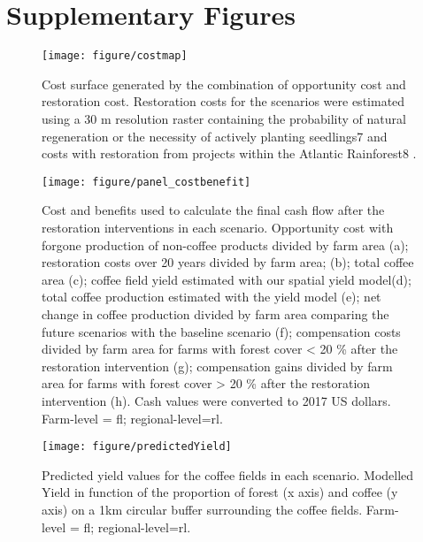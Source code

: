 \documentclass[
	12pt,				%
	oneside,			%
	a4paper,			%
	chapter=TITLE,		%
	section=TITLE,		%
	brazil,			%
	english				%
	]{abntex2}
\begin{document}
\hypertarget{supplementary-figures-1}{%
\section{Supplementary Figures}\label{supplementary-figures-1}}
\begin{figure}[H]

{\centering \texttt{[image: figure/costmap]} 

}

\caption{Cost surface generated by the combination of opportunity cost and restoration cost. Restoration costs for the scenarios were estimated using a 30 m resolution raster containing the probability of natural regeneration or the necessity of actively planting seedlings7 and costs with restoration from projects within the Atlantic Rainforest8 .}\label{fig:figureb1}
\end{figure}
\begin{figure}[H]

{\centering \texttt{[image: figure/panel\_costbenefit]} 

}

\caption{Cost and benefits used to calculate the final cash flow after the restoration interventions in each scenario. Opportunity cost with forgone production of non-coffee products divided by farm area (a);  restoration costs over 20 years divided by farm area; (b); total coffee area (c); coffee field yield estimated with our spatial yield model(d); total coffee production estimated with the yield model (e); net change in coffee production divided by farm area comparing the future scenarios with the baseline scenario (f); compensation costs divided by farm area for farms with forest cover < 20 \% after the restoration intervention (g); compensation gains divided by farm area for farms with forest cover > 20 \% after the restoration intervention (h). Cash values were converted to 2017 US dollars. Farm-level = fl; regional-level=rl.}\label{fig:figureb2}
\end{figure}
\begin{figure}[H]

{\centering \texttt{[image: figure/predictedYield]} 

}

\caption{Predicted yield values for the coffee fields in each scenario. Modelled Yield in function of the proportion of forest (x axis) and coffee (y axis) on a 1km circular buffer surrounding the coffee fields. Farm-level = fl; regional-level=rl.}\label{fig:figureb3}
\end{figure}
\end{document}
